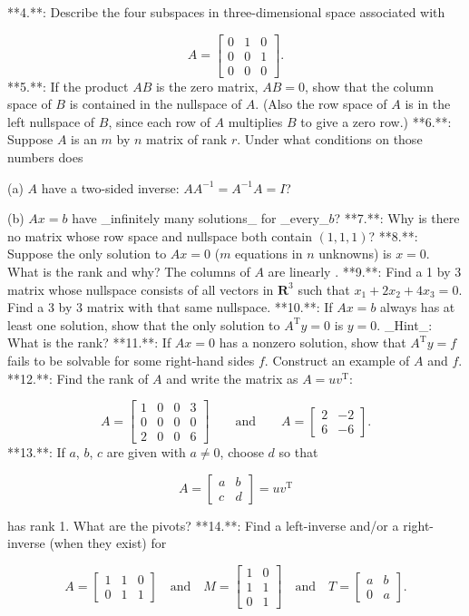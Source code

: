 

**4.**: Describe the four subspaces in three-dimensional space associated with

\[A=\begin{bmatrix}0&1&0\\ 0&0&1\\ 0&0&0\end{bmatrix}.\]
**5.**: If the product \(AB\) is the zero matrix, \(AB=0\), show that the column space of \(B\) is contained in the nullspace of \(A\). (Also the row space of \(A\) is in the left nullspace of \(B\), since each row of \(A\) multiplies \(B\) to give a zero row.)
**6.**: Suppose \(A\) is an \(m\) by \(n\) matrix of rank \(r\). Under what conditions on those numbers does

(a) \(A\) have a two-sided inverse: \(AA^{-1}=A^{-1}A=I\)?

(b) \(Ax=b\) have _infinitely many solutions_ for _every_\(b\)?
**7.**: Why is there no matrix whose row space and nullspace both contain \((1,1,1)\)?
**8.**: Suppose the only solution to \(Ax=0\) (\(m\) equations in \(n\) unknowns) is \(x=0\). What is the rank and why? The columns of \(A\) are linearly .
**9.**: Find a 1 by 3 matrix whose nullspace consists of all vectors in \(\mathbf{R}^{3}\) such that \(x_{1}+2x_{2}+4x_{3}=0\). Find a 3 by 3 matrix with that same nullspace.
**10.**: If \(Ax=b\) always has at least one solution, show that the only solution to \(A^{\mathrm{T}}y=0\) is \(y=0\). _Hint_: What is the rank?
**11.**: If \(Ax=0\) has a nonzero solution, show that \(A^{\mathrm{T}}y=f\) fails to be solvable for some right-hand sides \(f\). Construct an example of \(A\) and \(f\).
**12.**: Find the rank of \(A\) and write the matrix as \(A=uv^{\mathrm{T}}\):

\[A=\begin{bmatrix}1&0&0&3\\ 0&0&0&0\\ 2&0&0&6\end{bmatrix}\qquad\text{and}\qquad A=\begin{bmatrix}2&-2\\ 6&-6\end{bmatrix}.\]
**13.**: If \(a\), \(b\), \(c\) are given with \(a\neq 0\), choose \(d\) so that

\[A=\begin{bmatrix}a&b\\ c&d\end{bmatrix}=uv^{\mathrm{T}}\]

has rank 1. What are the pivots?
**14.**: Find a left-inverse and/or a right-inverse (when they exist) for

\[A=\begin{bmatrix}1&1&0\\ 0&1&1\end{bmatrix}\quad\text{and}\quad M=\begin{bmatrix}1&0\\ 1&1\\ 0&1\end{bmatrix}\quad\text{and}\quad T=\begin{bmatrix}a&b\\ 0&a\end{bmatrix}.\]